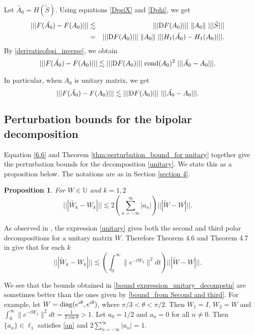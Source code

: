 \documentclass[12pt,epsfig,reqno]{amsart}
\newcommand{\De}{{\rm D}}
\newcommand{\diag}{{\rm diag}}
\newtheorem{prop}[thm]{Proposition}
\theoremstyle{remark}
\begin{document}
Let $\tilde{A_0}=H(\tilde S)$.
Using equations \eqref{DpsiX} and \eqref{Dphi}, we get
\begin{eqnarray*}
|||F(\tilde{A_0})-F(A_0)|||&\lesssim& |||\De F(A_0)||| \ \|A_0\|\ |||\tilde{S}|||\\
&=& |||\De F(A_0)|||\ \|A_0\|\ |||H_1(\tilde{A_0})-H_1(A_0)|||.
\end{eqnarray*}
By \eqref{derivatieofpsi_inverse}, we obtain
\begin{eqnarray}
|||F(\tilde{A_0})-F(A_0)|||\lesssim |||\De F(A_0)|||\ \text{\rm cond} (A_0) ^2 \ |||\tilde{A_0}-A_0|||.
\end{eqnarray}

In particular, when $A_0$ is unitary matrix, we get
\begin{equation}
|||F(\tilde{A_0})-F(A_0)|||\lesssim |||\De F(A_0)|||\ |||\tilde{A_0}-A_0|||. \label{6.6}
\end{equation}

\subsection{Perturbation bounds for the bipolar decomposition}
Equation \eqref{6.6} and Theorem \ref{thm:perturbation_bound_for unitary} together give the perturbation bounds for the decomposition  \eqref{unitary}. We state this as a proposition below. The notations are as in Section \ref{section 4}.
\begin{prop}
For $W\in \mathbb U$ and $k=1,2$
\begin{equation}
|||\tilde{W_k}-W_k|||\lesssim 2\left(\sum_{n=-\infty}^\infty |a_n|\right) |||\tilde{W}-W|||.\label{bound expression_unitary_decompstn}
\end{equation}
\end{prop}


As observed in \cite{bhatia_bipolar}, the expression \eqref{unitary} gives both the second and third polar decompositions for a unitary matrix $W$.  Therefore Theorem 4.6 and Theorem 4.7 in \cite{bhatia_Matrix_factorizations} give that for each $k$\begin{equation}|||\tilde{W}_k-W_k|||\lesssim\left(\displaystyle{\int_0^\infty}\|{e^{-tW_2}}\|^2 dt\right) |||\tilde{W}-W|||.\label{bound_from Second and third} \end{equation}

We see that the bounds obtained in \eqref{bound expression_unitary_decompstn} are sometimes better than the ones given  by \eqref{bound_from Second and third}. For example,
let   $W= \diag(e^{i\theta}, e^{i\theta})$, where $\pi/3<\theta<\pi/2$.  Then $W_1=I$, $W_2=W$ and$\displaystyle{\int_0^\infty}\|{e^{-tW_2}}\|^2 dt= \frac{1}{2\cos\theta}>1$.
Let $a_0=1/2$ and $a_n=0$ for all $n\neq 0$. Then $\{a_n\}\in \ell_1$ satisfies \eqref{an} and $2\sum_{n=-\infty}^{\infty} |a_n|=1$.
\end{document}

